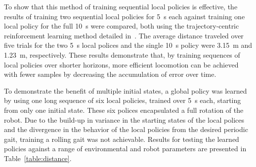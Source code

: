 
To show that this method of training sequential local policies is effective, the results of training two sequential local policies for \SI{5}{\second} each against training one local policy for the full \SI{10}{\second} were compared, both using the trajectory-centric reinforcement learning method detailed in~\cite{la-lnnpg-14}.
The average distance traveled over five trials for the two \SI{5}{\second} local polices and the single \SI{10}{\second} policy were \SI{3.15}{\meter} and \SI{1.23}{\meter}, respectively.
These results demonstrate that, by training sequences of local policies over shorter horizons, more efficient locomotion can be achieved with fewer samples by decreasing the accumulation of error over time.

To demonstrate the benefit of multiple initial states, a global policy was learned by using one long sequence of six local policies, trained over \SI{5}{\second} each, starting from only one initial state. 
These six polices encapsulated a full rotation of the robot.
Due to the build-up in variance in the starting states of the local polices and the divergence in the behavior of the local policies from the desired periodic gait, training a rolling gait was not achievable.
Results for testing the learned policies against a range of environmental and robot parameters are presented in Table~\ref{table:distance}. 


